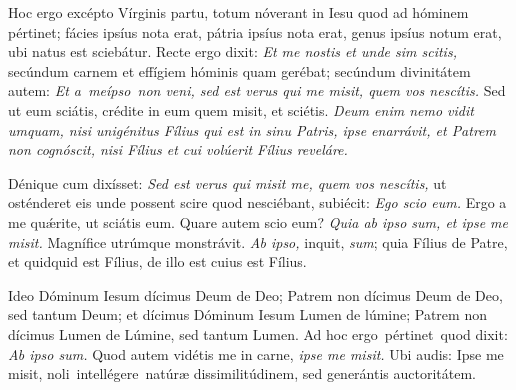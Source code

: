 {\noindent Hoc ergo excépto Vírginis partu, totum nóverant in Iesu quod ad hóminem pértinet; fácies ipsíus nota erat, pátria ipsíus nota erat, genus ipsíus notum erat, ubi natus est sciebátur. Recte ergo dixit: \textit{Et me nostis et unde sim scitis,} secúndum carnem et effígiem hóminis quam gerébat; secúndum divinitátem autem: \textit{Et a meípso non veni, sed est verus qui me misit, quem vos nescítis.} Sed ut eum sciátis, crédite in eum quem misit, et sciétis. \textit{Deum enim nemo vidit umquam, nisi unigénitus Fílius qui est in sinu Patris, ipse enarrávit, et Patrem non cognóscit, nisi Fílius et cui volúerit Fílius reveláre.}
 
\noindent Dénique cum dixísset: \textit{Sed est verus qui misit me, quem vos nescítis,} ut osténderet eis unde possent scire quod nesciébant, subiécit: \textit{Ego scio eum.} Ergo a me quǽrite, ut sciátis eum. Quare autem scio eum? \textit{Quia ab ipso sum, et ipse me misit.} Magnífice utrúmque monstrávit. \textit{Ab ipso,} inquit, \textit{sum}; quia Fílius de Patre, et quidquid est Fílius, de illo est cuius est Fílius.
	
\noindent Ideo Dóminum Iesum dícimus Deum de Deo; Patrem non dícimus Deum de Deo, sed tantum Deum; et dícimus Dóminum Iesum Lumen de lúmine; Patrem non dícimus Lumen de Lúmine, sed tantum Lumen. Ad hoc ergo pértinet quod dixit: \textit{Ab ipso sum.} Quod autem vidétis me in carne, \textit{ipse me misit.} Ubi audis: Ipse me misit, noli intellégere natúræ dissimilitúdinem, sed generántis auctoritátem.

\vfill
\pagebreak

 

\vspace{-5mm}

\vfill
\pagebreak
}
\newcommand{\benedictus}{\pars{Canticum Zachariæ.}  \scriptura{Mt. 13, 54-55}

\vspace{-4mm}

\antiphona{VIII G}{temporalia/ant-etdicebantunde.gtex}

\vspace{-2mm}

\scriptura{Lc. 1, 68-79}

\vspace{-2mm}

\cantusSineNeumas
\initiumpsalmi{temporalia/benedictus-initium-viiisoll-G-auto.gtex}


 \Abardot{}}


